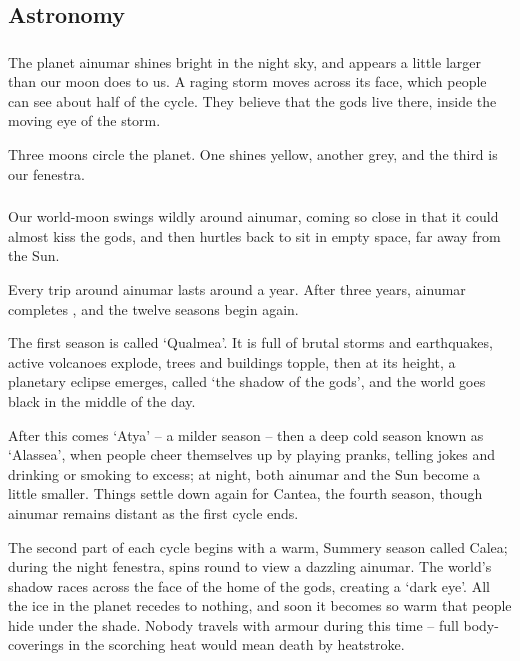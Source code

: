 \begin{multicols}{2}

\subsection{Astronomy}

\subsubsection{}

The planet \gls{ainumar} shines bright in the night sky, and appears a little larger than our moon does to us.
A raging storm moves across its face, which people can see about half of the \gls{cycle}.
They believe that the gods live there, inside the moving eye of the storm.

Three moons circle the planet.
One shines yellow, another grey, and the third is our \gls{fenestra}.

\subsubsection{}

Our world-moon swings wildly around \gls{ainumar}, coming so close in that it could almost kiss the gods, and then hurtles back to sit in empty space, far away from the Sun.

Every trip around \gls{ainumar} lasts around a year.
After three years, \gls{ainumar} completes , and the twelve seasons begin again.

The first season is called `\gls{Qualmea}'.
It is full of brutal storms and earthquakes, active volcanoes explode, trees and buildings topple, then at its height, a planetary eclipse emerges, called `the shadow of the gods', and the world goes black in the middle of the day.

After this comes `\gls{Atya}' -- a milder season -- then a deep cold season known as `\gls{Alassea}', when people cheer themselves up by playing pranks, telling jokes and drinking or smoking to excess; at night, both \gls{ainumar} and the Sun become a little smaller.
Things settle down again for \gls{Cantea}, the fourth season, though \gls{ainumar} remains distant as the first \gls{cycle} ends.

The second part of each \gls{cycle} begins with a warm, Summery season called \gls{Calea}; during the night \gls{fenestra}, spins round to view a dazzling \gls{ainumar}.
The world's shadow races across the face of the home of the gods, creating a `dark eye'.
All the ice in the planet recedes to nothing, and soon it becomes so warm that people hide under the shade.
Nobody travels with armour during this time -- full body-coverings in the scorching heat would mean death by heatstroke.


\end{multicols}
